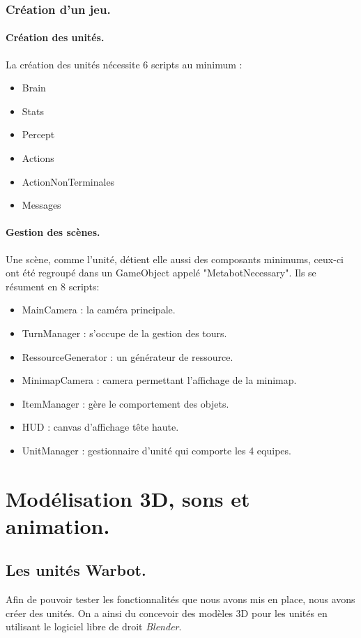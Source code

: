 \documentclass{report}
\begin{document}
\subsubsection{Création d'un jeu.}
\paragraph{Création des unités.}
La création des unités nécessite 6 scripts au minimum : 
\begin{itemize}
\item Brain
\item Stats
\item Percept
\item Actions
\item ActionNonTerminales
\item Messages
\end{itemize}
\paragraph{Gestion des scènes.}
Une scène, comme l'unité, détient elle aussi des composants minimums, ceux-ci ont été regroupé dans un GameObject appelé "MetabotNecessary".
Ils se résument en 8 scripts:
\begin{itemize}
\item MainCamera : la caméra principale.
\item TurnManager : s'occupe de la gestion des tours.
\item RessourceGenerator : un générateur de ressource.
\item MinimapCamera : camera permettant l'affichage de la minimap.
\item ItemManager : gère le comportement des objets.
\item HUD : canvas d'affichage tête haute.
\item UnitManager : gestionnaire d'unité qui comporte les 4 equipes.
\end{itemize}

\section{Modélisation 3D, sons et animation.}

\subsection{Les unités Warbot.}
Afin de pouvoir tester les fonctionnalités que nous avons mis en place, nous avons créer des unités. On a ainsi du concevoir des modèles 3D pour les unités en utilisant le logiciel libre de droit \textit{Blender}.
\end{document}
